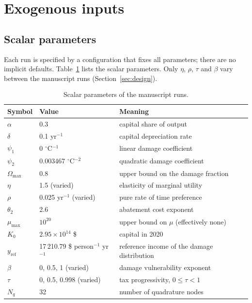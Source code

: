 \documentclass[11pt]{article}
\newcommand{\yref}{y_{\mathrm{ref}}}
\newcommand{\Nq}{N_{q}}
\begin{document}
\section{Exogenous inputs}
\label{sec:inputs}

\subsection{Scalar parameters}

Each run is specified by a configuration that fixes all parameters; there are
no implicit defaults. Table~\ref{tab:scalars} lists the scalar parameters.
Only $\eta$, $\rho$, $\tau$ and $\beta$ vary between the manuscript runs
(Section~\ref{sec:design}).

\begin{table}[ht]
\centering
\caption{Scalar parameters of the manuscript runs.}
\label{tab:scalars}
\small
\begin{tabular}{l l l}
\toprule
Symbol & Value & Meaning \\
\midrule
$\alpha$ & 0.3 & capital share of output \\
$\delta$ & 0.1 yr$^{-1}$ & capital depreciation rate \\
$\psi_1$ & 0 $^\circ$C$^{-1}$ & linear damage coefficient \\
$\psi_2$ & 0.003467 $^\circ$C$^{-2}$ & quadratic damage coefficient \\
$\Omega_{\max}$ & 0.8 & upper bound on the damage fraction \\
$\eta$ & 1.5 (varied) & elasticity of marginal utility \\
$\rho$ & 0.025 yr$^{-1}$ (varied) & pure rate of time preference \\
$\theta_2$ & 2.6 & abatement cost exponent \\
$\mu_{\max}$ & $10^{20}$ & upper bound on $\mu$ (effectively none) \\
$K_0$ & $2.95\times10^{14}$ \$ & capital in 2020 \\
$\yref$ & 17\,210.79 \$ person$^{-1}$ yr$^{-1}$ & reference income of the
  damage distribution \\
$\beta$ & 0, 0.5, 1 (varied) & damage vulnerability exponent \\
$\tau$ & 0, 0.5, 0.998 (varied) & tax progressivity, $0\le\tau<1$ \\
$\Nq$ & 32 & number of quadrature nodes \\
\bottomrule
\end{tabular}
\end{table}
\end{document}
